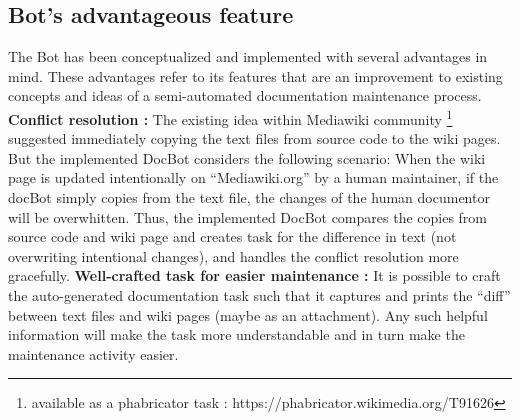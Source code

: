 \subsection{Bot's advantageous feature}\label{advantages}
The Bot has been conceptualized and implemented with several advantages in mind. These advantages refer to its features that are an improvement to existing concepts and ideas of a semi-automated documentation maintenance process.
\newline
\textbf{Conflict resolution : } The existing idea within Mediawiki community \footnote{available as a phabricator task :  https://phabricator.wikimedia.org/T91626} suggested immediately copying the text files from source code to the wiki pages. But the implemented DocBot considers the following scenario:
\newline 
\newline When the wiki page is updated intentionally on \enquote{Mediawiki.org} by a human maintainer, if the docBot simply copies from the text file, the changes of the human documentor will be overwhitten.
\newline Thus, the implemented DocBot compares the copies from source code and wiki page and creates task for the difference in text (not overwriting intentional changes), and handles the conflict resolution more gracefully.   
\newline \newline
\textbf{Well-crafted task for easier maintenance : } It is possible to craft the auto-generated documentation task such that it captures and prints the \enquote{diff} between text files and wiki pages (maybe as an attachment).  Any such helpful information will make the task more understandable and in turn make the maintenance activity easier.


